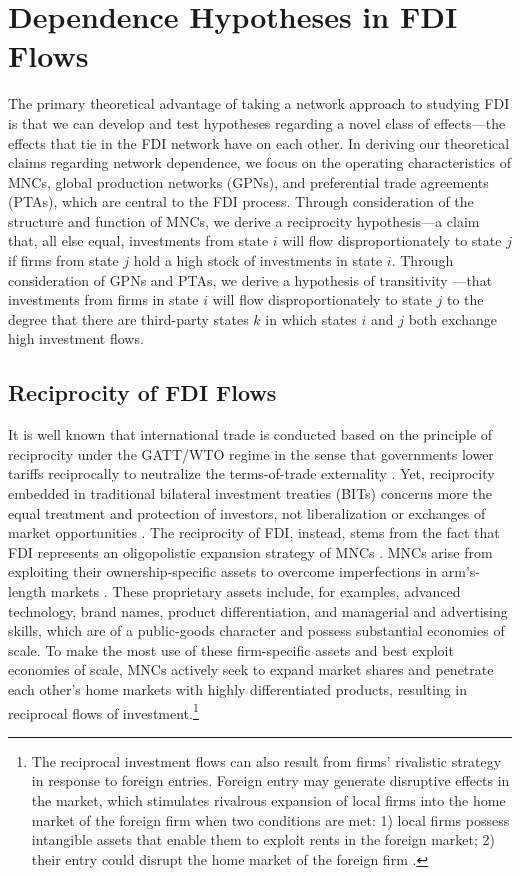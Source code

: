 \documentclass[reqno,onecolumn,letterpaper,12pt]{article}
\begin{document}
\section{Dependence Hypotheses in FDI Flows}

The primary theoretical advantage of taking a network approach to studying FDI is that we can develop and test hypotheses regarding a novel class of effects---the effects that tie in the FDI network have on each other. In deriving our theoretical claims regarding network dependence, we focus on the operating characteristics of MNCs, global production networks (GPNs), and preferential trade agreements (PTAs), which are central to the FDI process. Through consideration of the structure and function of MNCs, we derive a reciprocity \citep{garlaschelli2004patterns} hypothesis---a claim that, all else equal, investments from state $i$ will flow disproportionately to state $j$ if firms from state $j$ hold a high stock of investments in state $i$. Through consideration of GPNs and PTAs, we derive a hypothesis of transitivity \citep{holland1971transitivity}---that investments from firms in state $i$ will flow disproportionately to state $j$ to the degree that there are third-party states $k$ in which states $i$ and $j$ both exchange high investment flows.

\subsection{Reciprocity of FDI Flows}
It is well known that international trade is conducted based on the principle of reciprocity under the GATT/WTO regime in the sense that governments lower tariffs reciprocally to neutralize the terms-of-trade externality \citep{Bagwell_Staiger:1999}. Yet, reciprocity embedded in traditional bilateral investment treaties (BITs) concerns more the equal treatment and protection of investors, not liberalization or exchanges of market opportunities \citep[~56]{DiMascio_Pauwelyn:2008}. The reciprocity of FDI, instead, stems from the fact that FDI represents an oligopolistic expansion strategy of MNCs \citep{Hymer:1976,Kindleberger:1969}. MNCs arise from exploiting their ownership-specific assets to overcome imperfections in arm's-length markets \citep{Caves:1996,Dunning:1992}. These proprietary assets include, for examples, advanced technology, brand names, product differentiation, and managerial and advertising skills, which are of a public-goods character and possess substantial economies of scale. To make the most use of these firm-specific assets and best exploit economies of scale, MNCs actively seek to expand market shares and penetrate each other's home markets with highly differentiated products, resulting in reciprocal flows of investment.\footnote{The reciprocal investment flows can also result from firms' rivalistic strategy in response to foreign entries. Foreign entry may generate disruptive effects in the market, which stimulates rivalrous expansion of local firms into the home market of the foreign firm when two conditions are met: 1) local firms possess intangible assets that enable them to exploit rents in the foreign market; 2) their entry could disrupt the home market of the foreign firm \citep{Graham:1978}. }
\end{document}
